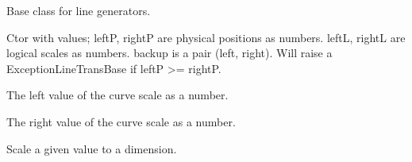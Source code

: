 \documentclass[letterpaper,10pt,english]{sphinxmanual}
\begin{document}
\begin{fulllineitems}
\label{\detokenize{ref/util/plot/PRESCfg:TotalDepth.util.plot.PRESCfg.LineTransBase}}
Base class for line generators.

\begin{fulllineitems}
\label{\detokenize{ref/util/plot/PRESCfg:TotalDepth.util.plot.PRESCfg.LineTransBase.__init__}}
Ctor with values; leftP, rightP are physical positions as numbers.
leftL, rightL are logical scales as numbers.
backup is a pair (left, right).
Will raise a ExceptionLineTransBase if leftP \textgreater{}= rightP.

\end{fulllineitems}


\begin{fulllineitems}
\label{\detokenize{ref/util/plot/PRESCfg:TotalDepth.util.plot.PRESCfg.LineTransBase.leftL}}
The left value of the curve scale as a number.

\end{fulllineitems}


\begin{fulllineitems}
\label{\detokenize{ref/util/plot/PRESCfg:TotalDepth.util.plot.PRESCfg.LineTransBase.rightL}}
The right value of the curve scale as a number.

\end{fulllineitems}


\begin{fulllineitems}
\label{\detokenize{ref/util/plot/PRESCfg:TotalDepth.util.plot.PRESCfg.LineTransBase.L2P}}
Scale a given value to a dimension.

\end{fulllineitems}


\end{fulllineitems}
\end{document}
